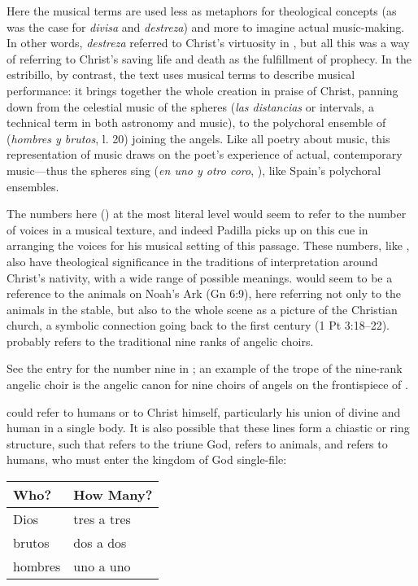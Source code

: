 Here the musical terms are used less as metaphors for theological concepts (as
was the case for \emph{divisa} and \emph{destreza}) and more to imagine actual
music-making.
In other words, \emph{destreza} referred to Christ's virtuosity in
, but all this was a way of
referring to Christ's saving life and death as the fulfillment of prophecy.
In the estribillo, by contrast, the text uses musical terms to describe musical
performance: it brings together the whole creation in praise of Christ, panning
down from the celestial music of the spheres (\emph{las distancias} or
intervals, a technical term in both astronomy and music), to the polychoral
ensemble of  (\emph{hombres y brutos}, l. 20) joining the
angels.
Like all poetry about music, this representation of music draws on the poet's
experience of actual, contemporary music---thus the spheres sing  (\emph{en uno y otro coro}, ), like Spain's
polychoral ensembles.

The numbers here () at the most
literal level would seem to refer to the number of voices in a musical texture,
and indeed Padilla picks up on this cue in arranging the voices for his musical
setting of this passage.
These numbers, like , also have theological
significance in the traditions of interpretation around Christ's nativity, with
a wide range of possible meanings.
 would seem to be a reference to the animals on Noah's Ark
(Gn 6:9), here referring not only to the animals in the stable, but also to the
whole scene as a picture of the Christian church, a symbolic connection going
back to the first century (1 Pt 3:18--22).%
    \Autocite[15:25]{Augustine:CivitateDei}
 probably refers to the traditional nine ranks of angelic
choirs.%
    \begin{Footnote}
        See the entry for the number nine in \autocite{Bongo:NumerorumMysteria};
        an example of the trope of the nine-rank angelic choir is the angelic
        canon for nine choirs of angels on the frontispiece of
        \autocite{Kircher:Musurgia}.
    \end{Footnote}
 could refer to humans or to Christ himself, particularly his
union of divine and human in a single body.
It is also possible that these lines form a chiastic or ring structure, such
that  refers to the triune God, 
refers to animals, and  refers to humans, who must enter the
kingdom of God single-file:
\begin{center}
    \begin{tabular}{ll}
        \toprule
        Who?    & How Many? \\
        \midrule
        Dios    & tres a tres \\
        brutos  & dos a dos \\
        hombres & uno a uno \\
        \bottomrule
    \end{tabular}
\end{center}

